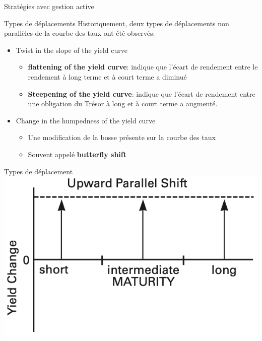 \documentclass[10pt,a4paper]{beamer}
\begin{document}
\begin{frame}{Stratégies avec gestion active}
\begin{block}{Types de déplacements}
Historiquement, deux types de déplacements non parallèles de la courbe des taux ont été observés:
\begin{itemize}[label=\bullet]
\item Twist in the slope of the yield curve 
\begin{itemize}[label=-]
\item \textbf{flattening of the yield curve}: indique que l'écart de rendement entre le rendement à long terme et à court terme a diminué
\item \textbf{Steepening of the yield curve}: indique que l'écart de rendement entre une obligation du Trésor à long et à court terme a augmenté. 
\end{itemize}
\item Change in the humpedness of the yield curve
\begin{itemize}[label=-]
\item Une modification de la bosse présente sur la courbe des taux
\item Souvent appelé \textbf{butterfly shift}
\end{itemize}
\end{itemize}
\end{block}
\end{frame}



\begin{frame}{Types de déplacement}
\includegraphics{1}
\end{frame}
\end{document}
